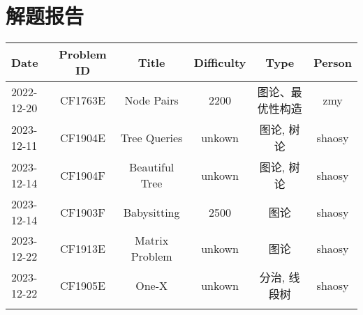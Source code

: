 \chapter{解题报告}
\begin{center}
\begin{longtable}{l c c c c c }

Date & Problem ID & Title & Difficulty & Type & Person   \\ 
\hline
2022-12-20 & CF1763E & Node Pairs & 2200 & 图论、最优性构造 & zmy  \\
2023-12-11 & CF1904E & Tree Queries & unkown & 图论, 树论 & shaosy \\
2023-12-14 & CF1904F & Beautiful Tree & unkown & 图论, 树论 & shaosy \\
2023-12-14 & CF1903F & Babysitting & 2500 & 图论 & shaosy \\
2023-12-22 & CF1913E & Matrix Problem & unkown & 图论 & shaosy \\
2023-12-22 & CF1905E & One-X & unkown & 分治, 线段树 & shaosy \\
\hline

\label{tab:practice_index}
\end{longtable}
\end{center}

